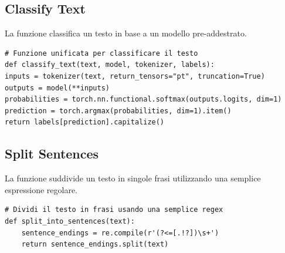 \documentclass{article}
\begin{document}
		\subsection{Classify Text}
La funzione classifica un testo in base a un modello pre-addestrato.
	\begin{lstlisting}
# Funzione unificata per classificare il testo
def classify_text(text, model, tokenizer, labels):
inputs = tokenizer(text, return_tensors="pt", truncation=True)
outputs = model(**inputs)
probabilities = torch.nn.functional.softmax(outputs.logits, dim=1)
prediction = torch.argmax(probabilities, dim=1).item()
return labels[prediction].capitalize()	
	\end{lstlisting}
	
		\subsection{Split Sentences}
	La funzione suddivide un testo in singole frasi utilizzando una semplice espressione regolare.
	\begin{lstlisting}
# Dividi il testo in frasi usando una semplice regex
def split_into_sentences(text):
	sentence_endings = re.compile(r'(?<=[.!?])\s+')
	return sentence_endings.split(text)
	\end{lstlisting}
	\newpage
\end{document}
